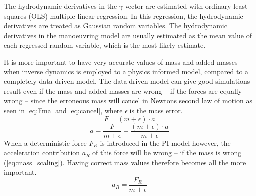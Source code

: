 The hydrodynamic derivatives in the \(\gamma\) vector are estimated with ordinary least squares (OLS) multiple linear regression.
In this regression, the hydrodynamic derivatives are treated as Gaussian random variables. The hydrodynamic derivatives in the manoeuvring model are usually estimated as the mean value of each regressed random variable, which is the most likely estimate.

It is more important to have very accurate values of mass and added masses when inverse dynamics is employed to a physics informed model, compared to a completely data driven model.
The data driven model can give good simulations result even if the mass and added masses are wrong -- if the forces are equally wrong -- since the erroneous mass will cancel in Newtons second law of motion as seen in \autoref{eq:Fma} and \autoref{eq:cancel}, where $\epsilon$ is the mass error.
\begin{equation}
    \label{eq:Fma}
    F = (m+\epsilon) \cdot a
\end{equation}
\begin{equation}
    \label{eq:cancel}
    a = \frac{F}{m+\epsilon} = \frac{(m+\epsilon) \cdot a}{m+\epsilon}
\end{equation}
When a deterministic force $F_R$ is introduced in the PI model however, the acceleration contribution $a_R$ of this force will be wrong -- if the mass is wrong (\autoref{eq:mass_scaling}). Having correct mass values therefore becomes all the more important.
\begin{equation}
    \label{eq:mass_scaling}
    a_R = \frac{F_R}{m+\epsilon}
\end{equation}